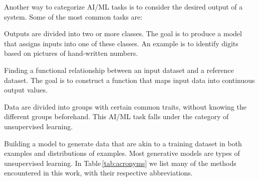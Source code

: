 \documentclass[aps,rmp,reprint,amsmath,amssymb,graphicx,longbibliography]{revtex4-2}
\begin{document}
Another way to categorize AI/ML tasks is to consider the desired output of a system. Some of the most common tasks are:
\makeatletter
\renewenvironment{description}%
               {}%
               {\endlist}
\makeatother
\begin{description}
    \item[Classification] Outputs are divided into two or more classes. The goal is to produce a model that assigns inputs into one of these classes. An example is to identify digits based on pictures of hand-written numbers. 
\item[Regression] Finding a functional relationship between an input dataset and a reference dataset. The goal is to construct a function that maps input data into continuous output values.
\item[Clustering] Data are divided into groups with certain common traits, without knowing the different groups beforehand. This AI/ML task falls  under the category of unsupervised learning.
\item[Generation] Building a model to generate data that are akin to a training dataset in both examples and distributions of examples. Most generative models are types of unsupervised learning.
\end{description}
In Table\,\ref{tab:acronyms} we list many of the methods encountered in this work, with their respective abbreviations.
\end{document}
